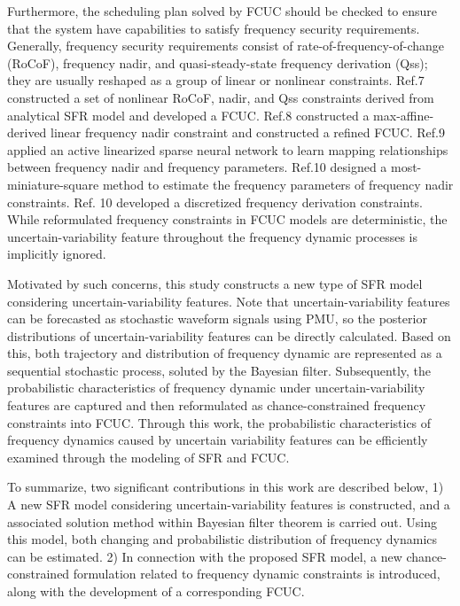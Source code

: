 \documentclass[lettersize,journal]{IEEEtran}
\begin{document}
Furthermore, the scheduling plan solved by FCUC should be checked to ensure that the system have capabilities to satisfy frequency security requirements. Generally, frequency security requirements
consist of rate-of-frequency-of-change (RoCoF), frequency nadir, and quasi-steady-state frequency derivation (Qss); they are usually reshaped as a group of linear or nonlinear constraints.  Ref.7
constructed a set of nonlinear RoCoF, nadir, and Qss constraints derived from analytical SFR model and developed a FCUC.  Ref.8 constructed a max-affine-derived linear frequency nadir constraint and
constructed a refined FCUC. Ref.9 applied an active linearized sparse neural network to learn mapping relationships between frequency nadir and frequency parameters.  Ref.10 designed a
most-miniature-square method to estimate the frequency parameters of frequency nadir constraints.  Ref. 10 developed a discretized frequency derivation constraints. While reformulated frequency
constraints in FCUC models are deterministic, the uncertain-variability feature throughout the frequency dynamic processes is implicitly ignored.

Motivated by such concerns, this study constructs a new type of SFR model considering uncertain-variability features. Note that uncertain-variability features can be forecasted as stochastic waveform signals using PMU, so the posterior distributions of uncertain-variability features can be directly calculated. Based on this, both trajectory and distribution of frequency dynamic are represented as a sequential stochastic process, soluted by the Bayesian filter.  Subsequently, the probabilistic characteristics of frequency dynamic under uncertain-variability features are captured and then reformulated as chance-constrained frequency constraints into FCUC. Through this work, the probabilistic characteristics of frequency dynamics caused by uncertain variability features can be efficiently examined through the modeling of SFR and FCUC.

To summarize, two significant contributions in this work are described below, 1) A new SFR model considering uncertain-variability features is constructed, and a associated solution method within
Bayesian filter theorem is carried out. Using this model, both changing and probabilistic distribution of frequency dynamics can be estimated.  2) In connection with the proposed SFR model, a new chance-constrained formulation related to frequency dynamic constraints is introduced, along with the development of a corresponding FCUC.
\end{document}
